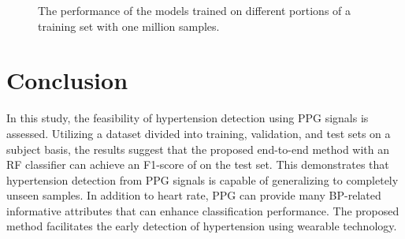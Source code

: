 \documentclass[letterpaper, 10 pt, conference]{ieeeconf}
\begin{document}
\begin{figure}[t]
	\centering
	\caption{The performance of the models trained on different portions of a training set with one million samples.}
	\vspace{-6mm}
\label{figure:bp}
\end{figure}


\section{Conclusion}

In this study, the feasibility of hypertension detection using PPG signals is assessed. Utilizing a dataset divided into training, validation, and test sets on a subject basis, the results suggest that the proposed end-to-end method with an RF classifier can achieve an F1-score of  on the test set. This demonstrates that hypertension detection from PPG signals is capable of generalizing to completely unseen samples. In addition to heart rate, PPG can provide many BP-related informative attributes that can enhance classification performance. The proposed method facilitates the early detection of hypertension using wearable technology.





\addtolength{\textheight}{-12cm}   
















\end{document}
